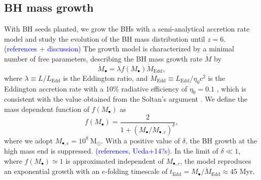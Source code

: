 \documentclass[twocolumn, twocolappendix]{aastex63}
\newcommand{\Msun}{\mathrm{M_\odot}}
\newcommand{\Mh}{M_\mathrm{h}}
\newcommand{\Mdot}{\dot{M}}
\newcommand{\tEdd}{t_\mathrm{Edd}}
\newcommand{\blue}[1]{\textcolor{blue}{ #1}}
\begin{document}
\begin{CJK*}{UTF8}{gbsn}
\vspace{2mm}
\subsection{BH mass growth}
With BH seeds planted, we grow the BHs with a semi-analytical accretion rate model and study the evolution of the BH mass distribution until $z=6$. 
\blue{(references + discussion)}
The growth model is characterized by a minimal number of free parameters, 
describing the BH mass growth rate $\Mdot$ by
\begin{equation}
  \label{eq:mdot}
  \Mdot_\bullet = \lambda f(M_\bullet) \Mdot_\mathrm{Edd} ,
\end{equation}
where $\lambda \equiv L/L_\mathrm{Edd}$ is the Eddington ratio,
and $\Mdot_\mathrm{Edd} \equiv L_{\mathrm{Edd}}/\eta_0 c^2$ is the Eddington accretion rate with a 10\% radiative efficiency of $\eta_0=0.1$ \citep{1973A&A....24..337S},
which is consistent with the value obtained from the Soltan's argument \citep{1982MNRAS.200..115S,2002MNRAS.335..965Y}.
We define the mass dependent function of $f(M_\bullet)$ as 
%
\begin{equation}
f(M_\bullet) = \frac{2}{1+\left(M_\bullet /M_{\bullet,c} \right)^\delta}, 
\end{equation}
%
where we adopt $M_{\bullet,c}=10^8~\Msun$.
With a positive value of $\delta$, the BH growth at the high mass end is suppressed. \blue{(references, Ueda+14?s)}.
In the limit of $\delta \ll 1$, where $f(M_\bullet) \simeq 1$ is approximated independent of $M_{\bullet,c}$, the model reproduces an exponential growth with an $e$-folding timescale of
$\tEdd =  M_\bullet/\Mdot_{\mathrm{Edd}} \approx 45$ Myr.




\end{CJK*}
\end{document}
